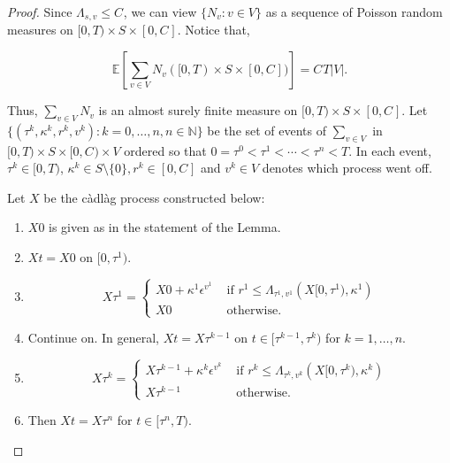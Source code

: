 \documentclass[12pt]{article}
\newcommand{\mb}{\mathbb}
\newcommand{\te}{\text}
\newcommand{\ep}{\epsilon}
\newcommand{\ind}{\hspace{24pt}}
\newcommand{\ex}[1]{\mb{E}\left[#1\right]}			%
\renewcommand{\v}{v}							%
\renewcommand{\S}{S}							%
\newcommand{\ev}[1]{\ep^{#1}}					%
\newcommand{\T}{T}								%
\renewcommand{\t}{t}							%
\renewcommand{\tt}{s}							%
\newcommand{\X}{X}								%
\newcommand{\poiss}[1]{N_{#1}}						%
\renewcommand{\r}{r}								%
\newcommand{\rt}[1]{\tau^{#1}}						%
\renewcommand{\it}{k}								%
\newcommand{\numb}{n}								%
\newcommand{\ratee}[1]{\Lambda_{#1}}				%
\newcommand{\const}[1]{C_{#1}}						%
\renewcommand{\mark}[1]{\kappa^{#1}}				%
\begin{document}
\begin{proof}
Since \(\ratee{\tt,\v} \leq \const{}\), we can view \(\{\poiss{\v}:\v\in V\}\) as a sequence of Poisson random measures on \([0,\T)\times \S\times [0,\const{}]\). Notice that,

\[\ex{\sum_{\v\in V}\poiss{\v}([0,\T)\times\S\times[0,\const{}])} = \const{}\T| V|.\]

Thus, \(\sum_{\v\in V}\poiss{\v}\) is an almost surely finite measure on \([0,\T)\times \S\times [0,\const{}]\). Let \(\{(\rt{\it},\mark{\it},\r^\it,\v^\it):\it = 0,\dots,\numb, \numb\in \mb{N}\}\) be the set of events of \(\sum_{\v\in V}\) in \([0,\T)\times\S\times [0,\const{})\times  V\) ordered so that \(0=\rt{0} < \rt{1} < \cdots < \rt{\numb} < \T\). In each event, \(\rt{\it} \in [0,\T)\), \(\mark{\it}\in \S\setminus\{0\}, \r^\it \in [0,\const{}]\) and \(\v^\it \in  V\) denotes which process went off.

\ind Let \(\X{}{}\) be the c\`adl\`ag process constructed below:

\begin{enumerate}
\item \(\X{}{0}\) is given as in the statement of the Lemma.

\item \(\X{}{\t} = \X{}{0}\) on \([0,\rt{1})\).

\item 

\[\X{}{\rt{1}} = \begin{cases}
\X{}{0} + \mark{1}\ev{\v^1} &\te{ if } \r^1 \leq \ratee{\rt{1},\v^1}(\X{}{[0,\rt{1})},\mark{1})\\
\X{}{0} &\te{ otherwise.}
\end{cases}
\] 

\item Continue on. In general, \(\X{}{\t} = \X{}{\rt{\it-1}}\) on \(\t \in [\rt{\it-1},\rt{\it})\) for \(\it= 1,\dots,\numb\).

\item 

\[\X{}{\rt{\it}} = \begin{cases}
\X{}{\rt{\it-1}} + \mark{\it}\ev{\v^\it} &\te{ if } \r^\it \leq \ratee{\rt{\it},\v^\it}(\X{}{[0,\rt{\it})},\mark{\it})\\
\X{}{\rt{\it-1}} &\te{ otherwise.}
\end{cases}\]

\item Then \(\X{}{\t} = \X{}{\rt{\numb}}\) for \(\t\in [\rt{\numb},\T)\).
\end{enumerate}


\end{proof}
\end{document}
